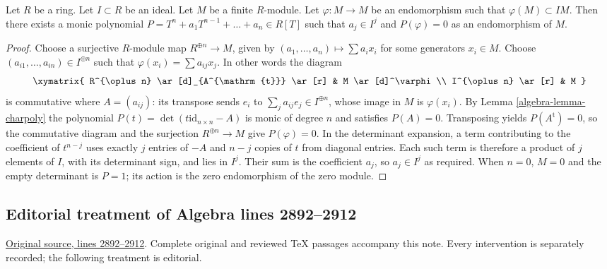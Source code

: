 \begin{lemma}
\label{editorial-source-lemma-charpoly-module-ideal}
Let $R$ be a ring. Let $I \subset R$ be an ideal.
Let $M$ be a finite $R$-module.
Let $\varphi : M \to M$ be an endomorphism such
that $\varphi(M) \subset IM$.
Then there exists a monic polynomial
$P = T^n + a_1 T^{n - 1} + \ldots + a_n \in R[T]$
such that $a_j \in I^j$ and $P(\varphi) = 0$ as an endomorphism of $M$.
\end{lemma}

\begin{proof}
Choose a surjective $R$-module map $R^{\oplus n} \to M$, given by
$(a_1, \ldots, a_n) \mapsto \sum a_ix_i$ for some generators $x_i \in M$.
Choose $(a_{i1}, \ldots, a_{in}) \in I^{\oplus n}$ such that
$\varphi(x_i) = \sum a_{ij} x_j$. In other words the diagram
$$
\xymatrix{
R^{\oplus n} \ar[d]_{A^{\mathrm{t}}} \ar[r] & M \ar[d]^\varphi \\
I^{\oplus n} \ar[r] & M
}
$$
is commutative where $A = (a_{ij})$: its transpose sends
$e_i$ to $\sum_j a_{ij}e_j \in I^{\oplus n}$, whose image in
$M$ is $\varphi(x_i)$. By
Lemma \ref{algebra-lemma-charpoly}
the polynomial
$P(t) = \det(t\text{id}_{n \times n} - A)$
is monic of degree $n$ and satisfies $P(A)=0$.
Transposing yields $P(A^{\mathrm{t}})=0$, so the commutative diagram
and the surjection $R^{\oplus n}\to M$ give $P(\varphi)=0$.
In the determinant expansion, a term contributing to the coefficient
of $t^{n-j}$ uses exactly $j$ entries of $-A$ and $n-j$ copies of $t$
from diagonal entries. Each such term is therefore a product of
$j$ elements of $I$, with its determinant sign, and lies in $I^j$.
Their sum is the coefficient $a_j$, so $a_j\in I^j$ as required.
When $n=0$, $M=0$ and the empty determinant is $P=1$;
its action is the zero endomorphism of the zero module.
\end{proof}


\subsection{Editorial treatment of Algebra lines 2892--2912}

\hypertarget{algebra-context-011}{}

\noindent\href{https://github.com/stacks/stacks-project/blob/a04446e57ec1fbc252a871afcec7752fb2807b14/algebra.tex\#L2892}{Original source, lines 2892--2912}. Complete original and reviewed TeX passages accompany this note. Every intervention is separately recorded; the following treatment is editorial.


